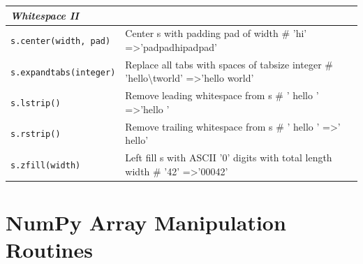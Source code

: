 \documentclass[a4paper,11pt]{book}
\begin{document}
\begin{appendices}
\begin{table}[!htbp]
\begin{tabular}{lp{11cm}}
\textit{Whitespace II}            &                                                                                                                                                 \\ \midrule
\texttt{s.center(width, pad)  }   & Center s with padding pad of width \# 'hi' =\textgreater 'padpadhipadpad'                                                                       \\
\texttt{s.expandtabs(integer)}    & Replace all tabs with spaces of tabsize integer \# 'hello\textbackslash{}tworld' =\textgreater 'hello world'                                    \\
\texttt{s.lstrip()        }       & Remove leading whitespace from s \# ' hello ' =\textgreater 'hello '                                                                            \\
\texttt{s.rstrip()       }        & Remove trailing whitespace from s \# ' hello ' =\textgreater ' hello'                                                                           \\
\texttt{s.zfill(width)  }         & Left fill s with ASCII '0' digits with total length width \# '42' =\textgreater '00042'  
   \\                                                      
\bottomrule
\end{tabular}
\end{table}
\clearpage

\section{NumPy Array Manipulation Routines}


\end{appendices}
\end{document}
